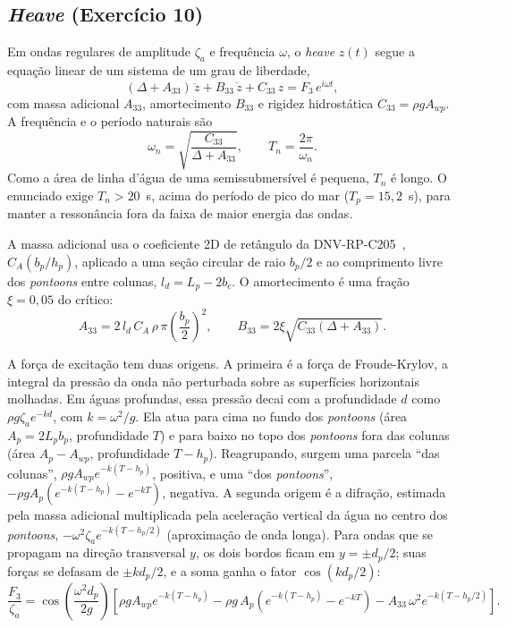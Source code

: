 \documentclass[11pt,a4paper]{article}
\begin{document}
\subsection{\emph{Heave} (Exercício 10)}\label{sec:heave-teoria}

Em ondas regulares de amplitude $\zeta_a$ e frequência $\omega$, o \emph{heave} $z(t)$ segue a
equação linear de um sistema de um grau de liberdade,
\begin{equation}
(\Delta + A_{33})\,\ddot z + B_{33}\,\dot z + C_{33}\,z = F_3\, e^{i\omega t} ,
\end{equation}
com massa adicional $A_{33}$, amortecimento $B_{33}$ e rigidez hidrostática
$C_{33} = \rho g A_{wp}$. A frequência e o período naturais são
\begin{equation}
\omega_n = \sqrt{\frac{C_{33}}{\Delta + A_{33}}}, \qquad T_n = \frac{2\pi}{\omega_n} .
\end{equation}
Como a área de linha d'água de uma semissubmersível é pequena, $T_n$ é longo. O enunciado exige
$T_n > 20$~s, acima do período de pico do mar ($T_p = 15{,}2$~s), para manter a ressonância fora
da faixa de maior energia das ondas.

A massa adicional usa o coeficiente 2D de retângulo da DNV-RP-C205~\cite{c205}, $C_A(b_p/h_p)$,
aplicado a uma seção circular de raio $b_p/2$ e ao comprimento livre dos \emph{pontoons} entre
colunas, $l_d = L_p - 2b_c$. O amortecimento é uma fração $\xi = 0{,}05$ do crítico:
\begin{equation}
A_{33} = 2\, l_d\, C_A\, \rho\, \pi \left(\frac{b_p}{2}\right)^2, \qquad
B_{33} = 2\xi\sqrt{C_{33}(\Delta + A_{33})} .
\end{equation}

A força de excitação tem duas origens. A primeira é a força de Froude-Krylov, a integral da
pressão da onda não perturbada sobre as superfícies horizontais molhadas. Em águas profundas, essa
pressão decai com a profundidade $d$ como $\rho g \zeta_a e^{-kd}$, com $k = \omega^2/g$. Ela atua
para cima no fundo dos \emph{pontoons} (área $A_p = 2L_pb_p$, profundidade $T$) e para baixo no
topo dos \emph{pontoons} fora das colunas (área $A_p - A_{wp}$, profundidade $T - h_p$).
Reagrupando, surgem uma parcela ``das colunas'', $\rho g A_{wp} e^{-k(T-h_p)}$, positiva, e uma
``dos \emph{pontoons}'', $-\rho g A_p (e^{-k(T-h_p)} - e^{-kT})$, negativa. A segunda origem é a
difração, estimada pela massa adicional multiplicada pela aceleração vertical da água no centro
dos \emph{pontoons}, $-\omega^2\zeta_a e^{-k(T-h_p/2)}$ (aproximação de onda longa). Para ondas
que se propagam na direção transversal $y$, os dois bordos ficam em $y = \pm d_p/2$; suas forças
se defasam de $\pm k d_p/2$, e a soma ganha o fator $\cos(k d_p/2)$:
\begin{equation}
\frac{F_3}{\zeta_a} = \cos\!\left(\frac{\omega^2 d_p}{2g}\right)\left[
\rho g A_{wp} e^{-k(T-h_p)}
- \rho g\, A_p \left(e^{-k(T-h_p)} - e^{-kT}\right)
- A_{33}\,\omega^2 e^{-k(T-h_p/2)} \right].
\end{equation}
\end{document}
